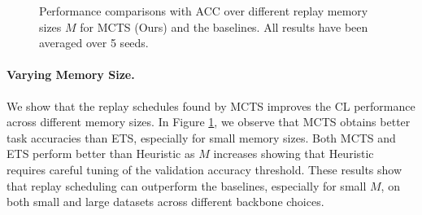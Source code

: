 \vspace{-3mm}
\begin{figure}
	\vspace{-3mm}
	\hspace{-11mm}
	\setlength{\figwidth}{0.36\textwidth}
	\setlength{\figheight}{.16\textheight}
	\resizebox{0.58\textwidth}{!}{
		
	}
	\vspace{-7mm}
	\captionsetup{width=.9\linewidth}
	\caption{Performance comparisons with ACC over different replay memory sizes $M$ for MCTS (Ours) and the baselines. All results have been averaged over 5 seeds. %
	}
	\vspace{-3mm}
	\label{fig:acc_over_memory_size}
\end{figure}
\paragraph{Varying Memory Size.} We show that the replay schedules found by MCTS improves the CL performance across different memory sizes. In Figure \ref{fig:acc_over_memory_size}, we observe that MCTS obtains better task accuracies than ETS, especially for small memory sizes. Both MCTS and ETS perform better than Heuristic as $M$ increases showing that Heuristic requires careful tuning of the validation accuracy threshold. These results show that replay scheduling can outperform the baselines, especially for small $M$, on both small and large datasets across different backbone choices.



\vspace{-3mm}
